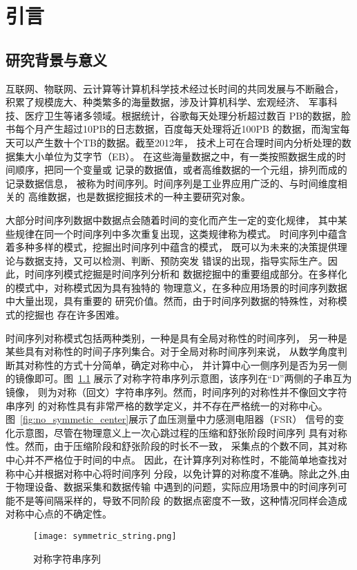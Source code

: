 
\chapter{引言}

\section{研究背景与意义}
互联网、物联网、云计算等计算机科学技术经过长时间的共同发展与不断融合，
积累了规模庞大、种类繁多的海量数据，涉及计算机科学、宏观经济、
军事科技、医疗卫生等诸多领域。根据统计，谷歌每天处理分析超过数百
PB的数据，脸书每个月产生超过10PB的日志数据，百度每天处理将近100PB
的数据，而淘宝每天可以产生数十个TB的数据。截至2012年，
技术上可在合理时间内分析处理的数据集大小单位为艾字节（EB）。
在这些海量数据之中，有一类按照数据生成的时间顺序，把同一个变量或
记录的数据值，或者高维数据的一个元组，排列而成的记录数据信息，
被称为时间序列。时间序列是工业界应用广泛的、与时间维度相关的
高维数据，也是数据挖掘技术的一种主要研究对象。

大部分时间序列数据中数据点会随着时间的变化而产生一定的变化规律，
其中某些规律在同一个时间序列中多次重复出现，这类规律称为模式。
时间序列中蕴含着多种多样的模式，挖掘出时间序列中蕴含的模式，
既可以为未来的决策提供理论与数据支持，又可以检测、判断、预防突发
错误的出现，指导实际生产。因此，时间序列模式挖掘是时间序列分析和
数据挖掘中的重要组成部分。在多样化的模式中，对称模式因为具有独特的
物理意义，在多种应用场景的时间序列数据中大量出现，具有重要的
研究价值。然而，由于时间序列数据的特殊性，对称模式的挖掘也
存在许多困难。

时间序列对称模式包括两种类别，一种是具有全局对称性的时间序列，
另一种是某些具有对称性的时间子序列集合。对于全局对称时间序列来说，
从数学角度判断其对称性的方式十分简单，确定对称中心，
并计算中心一侧序列是否为另一侧的镜像即可。图~\ref{fig:symmetric_string}
展示了对称字符串序列示意图，该序列在“D”两侧的子串互为镜像，
则为对称（回文）字符串序列。然而，时间序列的对称性并不像回文字符串序列
的对称性具有非常严格的数学定义，并不存在严格统一的对称中心。
图~\ref{fig:no_symmetic_center}展示了血压测量中力感测电阻器（FSR）
信号的变化示意图，尽管在物理意义上一次心跳过程的压缩和舒张阶段时间序列
具有对称性。然而，由于压缩阶段和舒张阶段的时长不一致，
采集点的个数不同，其对称中心并不严格位于时间的中点。
因此，在计算序列对称性时，不能简单地查找对称中心并根据对称中心将时间序列
分段，以免计算的对称度不准确。除此之外,由于物理设备、数据采集和数据传输
中遇到的问题，实际应用场景中的时间序列可能不是等间隔采样的，导致不同阶段
的数据点密度不一致，这种情况同样会造成对称中心点的不确定性。
\begin{figure}
  \centering
  \texttt{[image: symmetric\_string.png]}
  \caption{对称字符串序列}
  \label{fig:symmetric_string}
\end{figure}

